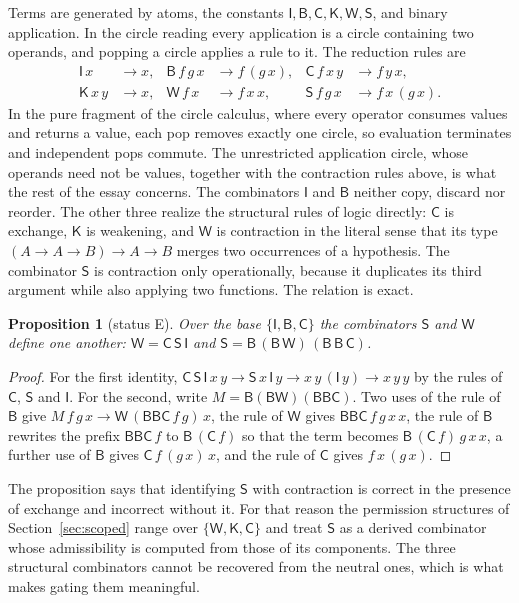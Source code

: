 \documentclass[11pt]{article}
\newtheorem{proposition}[theorem]{Proposition}
\theoremstyle{definition}
\theoremstyle{remark}
\newcommand{\cI}{\mathsf{I}}
\newcommand{\cB}{\mathsf{B}}
\newcommand{\cC}{\mathsf{C}}
\newcommand{\cK}{\mathsf{K}}
\newcommand{\cW}{\mathsf{W}}
\newcommand{\cS}{\mathsf{S}}
\newcommand{\Et}{status E}
\begin{document}
Terms are generated by atoms, the constants $\cI,\cB,\cC,\cK,\cW,\cS$, and binary application. In the circle reading every application is a circle containing two operands, and popping a circle applies a rule to it. The reduction rules are
\begin{align*}
\cI\,x &\to x, &
\cB\,f\,g\,x &\to f\,(g\,x), &
\cC\,f\,x\,y &\to f\,y\,x,\\
\cK\,x\,y &\to x, &
\cW\,f\,x &\to f\,x\,x, &
\cS\,f\,g\,x &\to f\,x\,(g\,x).
\end{align*}
In the pure fragment of the circle calculus, where every operator consumes values and returns a value, each pop removes exactly one circle, so evaluation terminates and independent pops commute. The unrestricted application circle, whose operands need not be values, together with the contraction rules above, is what the rest of the essay concerns. The combinators $\cI$ and $\cB$ neither copy, discard nor reorder. The other three realize the structural rules of logic directly: $\cC$ is exchange, $\cK$ is weakening, and $\cW$ is contraction in the literal sense that its type $(A\to A\to B)\to A\to B$ merges two occurrences of a hypothesis. The combinator $\cS$ is contraction only operationally, because it duplicates its third argument while also applying two functions. The relation is exact.

\begin{proposition}[\Et]\label{prop:SW}
Over the base $\{\cI,\cB,\cC\}$ the combinators $\cS$ and $\cW$ define one another: $\cW=\cC\,\cS\,\cI$ and $\cS=\cB\,(\cB\,\cW)\,(\cB\,\cB\,\cC)$.
\end{proposition}

\begin{proof}
For the first identity, $\cC\,\cS\,\cI\,x\,y\to\cS\,x\,\cI\,y\to x\,y\,(\cI\,y)\to x\,y\,y$ by the rules of $\cC$, $\cS$ and $\cI$. For the second, write $M=\cB(\cB\cW)(\cB\cB\cC)$. Two uses of the rule of $\cB$ give $M\,f\,g\,x\to\cW\,(\cB\cB\cC\,f\,g)\,x$, the rule of $\cW$ gives $\cB\cB\cC\,f\,g\,x\,x$, the rule of $\cB$ rewrites the prefix $\cB\cB\cC\,f$ to $\cB\,(\cC\,f)$ so that the term becomes $\cB\,(\cC\,f)\,g\,x\,x$, a further use of $\cB$ gives $\cC\,f\,(g\,x)\,x$, and the rule of $\cC$ gives $f\,x\,(g\,x)$.
\end{proof}

The proposition says that identifying $\cS$ with contraction is correct in the presence of exchange and incorrect without it. For that reason the permission structures of Section~\ref{sec:scoped} range over $\{\cW,\cK,\cC\}$ and treat $\cS$ as a derived combinator whose admissibility is computed from those of its components. The three structural combinators cannot be recovered from the neutral ones, which is what makes gating them meaningful.
\end{document}
